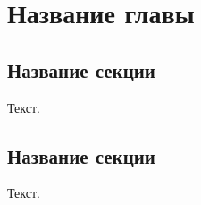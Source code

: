 
\chapter{Название главы}
\label{app1}

\section{Название секции}
\label{app1:sec1}

Текст.

\section{Название секции}
\label{app1:sec2}

Текст.

